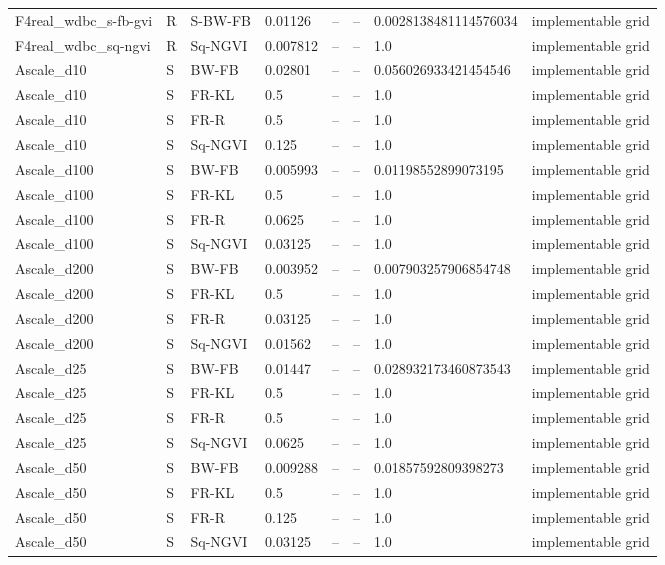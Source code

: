 \begin{tabular}{llllllll}
F4real\_wdbc\_s-fb-gvi & R & S-BW-FB & 0.01126 & -- & -- & 0.0028138481114576034 & implementable grid \\
F4real\_wdbc\_sq-ngvi & R & Sq-NGVI & 0.007812 & -- & -- & 1.0 & implementable grid \\
Ascale\_d10 & S & BW-FB & 0.02801 & -- & -- & 0.056026933421454546 & implementable grid \\
Ascale\_d10 & S & FR-KL & 0.5 & -- & -- & 1.0 & implementable grid \\
Ascale\_d10 & S & FR-R & 0.5 & -- & -- & 1.0 & implementable grid \\
Ascale\_d10 & S & Sq-NGVI & 0.125 & -- & -- & 1.0 & implementable grid \\
Ascale\_d100 & S & BW-FB & 0.005993 & -- & -- & 0.01198552899073195 & implementable grid \\
Ascale\_d100 & S & FR-KL & 0.5 & -- & -- & 1.0 & implementable grid \\
Ascale\_d100 & S & FR-R & 0.0625 & -- & -- & 1.0 & implementable grid \\
Ascale\_d100 & S & Sq-NGVI & 0.03125 & -- & -- & 1.0 & implementable grid \\
Ascale\_d200 & S & BW-FB & 0.003952 & -- & -- & 0.007903257906854748 & implementable grid \\
Ascale\_d200 & S & FR-KL & 0.5 & -- & -- & 1.0 & implementable grid \\
Ascale\_d200 & S & FR-R & 0.03125 & -- & -- & 1.0 & implementable grid \\
Ascale\_d200 & S & Sq-NGVI & 0.01562 & -- & -- & 1.0 & implementable grid \\
Ascale\_d25 & S & BW-FB & 0.01447 & -- & -- & 0.028932173460873543 & implementable grid \\
Ascale\_d25 & S & FR-KL & 0.5 & -- & -- & 1.0 & implementable grid \\
Ascale\_d25 & S & FR-R & 0.5 & -- & -- & 1.0 & implementable grid \\
Ascale\_d25 & S & Sq-NGVI & 0.0625 & -- & -- & 1.0 & implementable grid \\
Ascale\_d50 & S & BW-FB & 0.009288 & -- & -- & 0.01857592809398273 & implementable grid \\
Ascale\_d50 & S & FR-KL & 0.5 & -- & -- & 1.0 & implementable grid \\
Ascale\_d50 & S & FR-R & 0.125 & -- & -- & 1.0 & implementable grid \\
Ascale\_d50 & S & Sq-NGVI & 0.03125 & -- & -- & 1.0 & implementable grid \\

\end{tabular}
